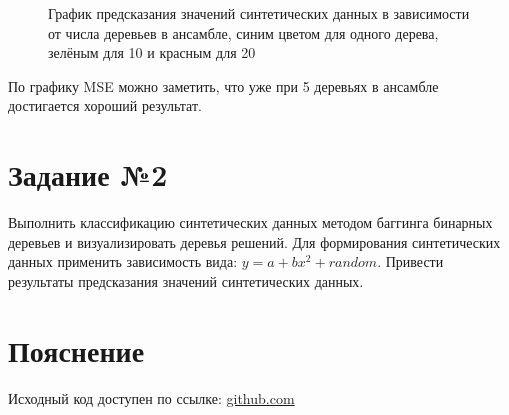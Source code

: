 \documentclass{article} %
\begin{document}
\begin{figure}[H]
    \centering
    \noindent{}
    \caption{График предсказания значений синтетических данных в зависимости от числа деревьев в ансамбле, синим цветом для одного дерева, зелёным для 10 и красным для 20}
\end{figure}
\bigskip

По графику MSE можно заметить, что уже при 5 деревьях в ансамбле достигается хороший результат.

\clearpage
\section{Задание №2}
Выполнить классификацию синтетических данных методом баггинга бинарных
деревьев и визуализировать деревья решений. Для формирования синтетических данных
применить зависимость вида: $y = a+b x^2 + random$. Привести результаты предсказания
значений синтетических данных.
\bigskip

%
% 
%
%

\section{Пояснение}
Исходный код доступен по ссылке:
\href{https://github.com/SvichkarevAnatoly/Course-Python-Bioinformatics/tree/master/semester2/task6}
{github.com}
\end{document}
